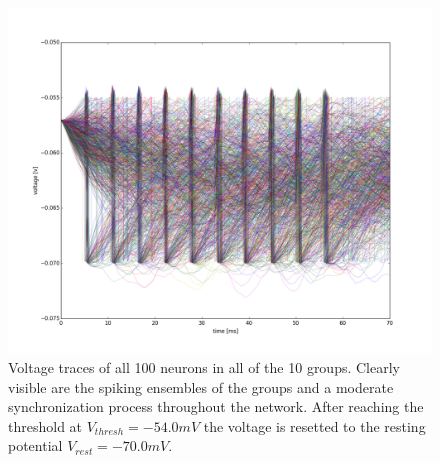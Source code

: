 \documentclass[12pt,a4paper, bibliography=totoc, listof=numbered, footexclude, BCOR=8.25mm, twoside]{scrartcl}
\begin{document}
  
  \begin{figure}[H]
  \centering
  \includegraphics[width=1.0\linewidth]{./Plots/Our_Plots/voltageplot}
  \caption{Voltage traces of all 100 neurons in all of the 10 groups. Clearly visible are the spiking ensembles of the groups and a moderate synchronization process throughout the network. After reaching the threshold at $V_{thresh}=-54.0 mV$ the voltage is resetted to the resting potential $V_{rest}=-70.0 mV$. }
  \label{fig:voltageplot}
  \end{figure}
\end{document}
